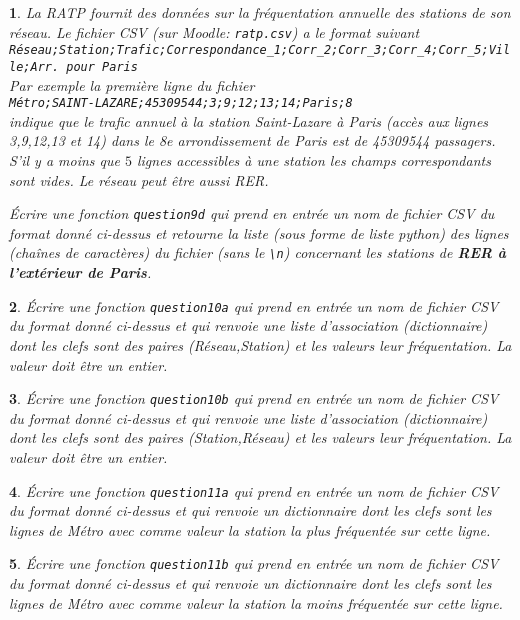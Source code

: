 \documentclass[10pt]{article}
\newtheorem{exi}{}
\newenvironment{exo}{\begin{exi}\em}{\end{exi}}
\begin{document}
\begin{exo}
    La RATP fournit des données sur la fréquentation annuelle des stations de son
réseau. Le fichier CSV (sur Moodle: \verb+ratp.csv+) a le format suivant\\
\verb+Réseau;Station;Trafic;Correspondance_1;Corr_2;Corr_3;Corr_4;Corr_5;Ville;Arr. pour Paris+\\
Par exemple la première ligne du fichier\\
\verb+Métro;SAINT-LAZARE;45309544;3;9;12;13;14;Paris;8+\\
indique que le trafic annuel à la station Saint-Lazare à Paris (accès aux lignes 3,9,12,13 et 14) dans le 8e arrondissement de Paris est de 45309544 passagers.
S'il y a moins que $5$ lignes accessibles à une station les champs correspondants sont vides.  Le réseau peut être aussi RER.

Écrire une fonction {\tt question9d} qui prend en entrée un nom de fichier CSV
du format donné ci-dessus
et retourne la liste (sous forme de liste python) des lignes (chaînes
de caractères) du fichier (sans le \verb+\n+)
concernant les stations de {\bf RER à l'extérieur de Paris}.
\end{exo}
\vspace*{-2ex}
\begin{exo}
    Écrire une fonction {\tt question10a} qui prend en entrée un nom de fichier CSV
du format donné ci-dessus
et qui renvoie une liste d'association (dictionnaire) dont les clefs sont
des paires (Réseau,Station) et les valeurs leur fréquentation.
La valeur doit être un entier.
\end{exo}
\vspace*{-2ex}
\begin{exo}
    Écrire une fonction {\tt question10b} qui prend en entrée un nom de fichier CSV
du format donné ci-dessus
et qui renvoie une liste d'association (dictionnaire) dont les clefs sont
des paires (Station,Réseau) et les valeurs leur fréquentation.
La valeur doit être un entier.
\end{exo}
\vspace*{-2ex}
\begin{exo}
    Écrire une fonction {\tt question11a} qui prend en entrée un nom de fichier CSV
du format donné ci-dessus et qui renvoie un dictionnaire dont les clefs sont
les lignes de Métro
avec comme valeur la station la plus fréquentée sur cette ligne.
\end{exo}
\vspace*{-2ex}
\begin{exo}
    Écrire une fonction {\tt question11b} qui prend en entrée un nom de fichier CSV
du format donné ci-dessus et qui renvoie un dictionnaire dont les clefs sont
les lignes de Métro
avec comme valeur la station la moins fréquentée sur cette ligne.
\end{exo}
\vspace*{-2ex}
\end{document}
